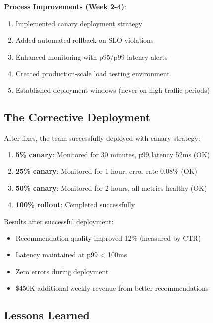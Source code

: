 \textbf{Process Improvements (Week 2-4)}:
\begin{enumerate}
    \item Implemented canary deployment strategy
    \item Added automated rollback on SLO violations
    \item Enhanced monitoring with p95/p99 latency alerts
    \item Created production-scale load testing environment
    \item Established deployment windows (never on high-traffic periods)
\end{enumerate}

\subsection{The Corrective Deployment}

After fixes, the team successfully deployed with canary strategy:

\begin{enumerate}
    \item \textbf{5\% canary}: Monitored for 30 minutes, p99 latency 52ms (OK)
    \item \textbf{25\% canary}: Monitored for 1 hour, error rate 0.08\% (OK)
    \item \textbf{50\% canary}: Monitored for 2 hours, all metrics healthy (OK)
    \item \textbf{100\% rollout}: Completed successfully
\end{enumerate}

Results after successful deployment:
\begin{itemize}
    \item Recommendation quality improved 12\% (measured by CTR)
    \item Latency maintained at p99 < 100ms
    \item Zero errors during deployment
    \item \$450K additional weekly revenue from better recommendations
\end{itemize}

\subsection{Lessons Learned}

